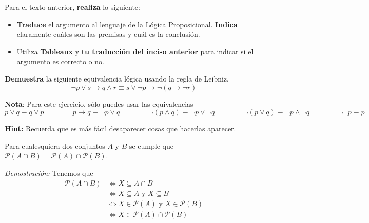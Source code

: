 \documentclass[oneside]{style}
\begin{document}
\begin{questions}[label=\protect\circled{\bfseries\arabic*}]
{        Para el texto anterior, \textbf{realiza} lo siguiente:
        \begin{itemize}
            \item \textbf{Traduce} el argumento al lenguaje de la Lógica 
            Proposicional. \textbf{Indica} claramente cuáles son las premisas y
            cuál es la conclusión. 
            
            \item Utiliza \textbf{Tableaux} y \textbf{tu traducción del inciso 
            anterior} para indicar si el argumento es correcto o no. 
        \end{itemize}

    }    
    
    \question
    {
        \textbf{Demuestra} la siguiente equivalencia lógica usando la regla de 
        Leibniz.
        \begin{equation*}
            \neg p \lor s \rightarrow q \land r \equiv s \lor \neg p 
            \rightarrow \neg (q \rightarrow \neg r)
        \end{equation*}

        \textbf{Nota}: Para este ejercicio, sólo puedes usar las equivalencias 
        \begin{equation*}
            p\lor q \equiv q \lor p \quad \quad \quad \quad 
            p \rightarrow q \equiv \neg p \lor q \quad \quad \quad \quad 
            \neg (p \land q) \equiv \neg p \lor \neg q \quad \quad \quad \quad 
            \neg (p \lor q) \equiv \neg p \land \neg q \quad \quad \quad \quad
            \neg \neg p \equiv p 
        \end{equation*}

        \textbf{Hint:} Recuerda que es más fácil desaparecer cosas que hacerlas aparecer. 
    }

    \newpage
    \question
    {

        Para cualesquiera dos conjuntos $A$ y $B$ se cumple que $\mathcal{P}(A 
        \cap B) = \mathcal{P}(A) \cap \mathcal{P}(B)$.

        \textit{Demostración:} Tenemos que 
        \begin{align*}
            \mathcal{P}(A \cap B) &\Leftrightarrow X \subseteq A \cap B \\ 
            &\Leftrightarrow X \subseteq A \text{ y } X \subseteq B \\ 
            &\Leftrightarrow X \in \mathcal{P}(A) \text{ y } X \in \mathcal{P}(B) \\
            &\Leftrightarrow X \in \mathcal{P}(A) \cap \mathcal{P}(B)  
        \end{align*}

}
\end{questions}
\end{document}
